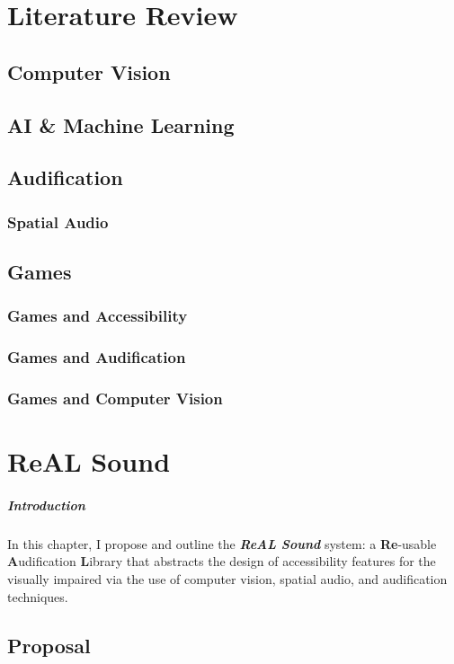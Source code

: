 \documentclass{report}
\newcommand{\rs}{ReAL Sound\xspace}
\newcommand{\rsfull}{\textbf{Re}-usable \textbf{A}udification \textbf{L}ibrary\xspace}
\begin{document}
\chapter{Literature Review} 
\section{Computer Vision}
\section{AI \& Machine Learning}
\section{Audification}
\subsection{Spatial Audio}
\section{Games}
\subsection{Games and Accessibility}
\subsection{Games and Audification}
\subsection{Games and Computer Vision}


\chapter{ReAL Sound}
\paragraph{Introduction}
In this chapter, I propose and outline the \textbf{\emph{\rs}} system: a \rsfull that abstracts the design of accessibility features for the visually impaired via the use of computer vision, spatial audio, and audification techniques.

\section{Proposal} 
\end{document}

